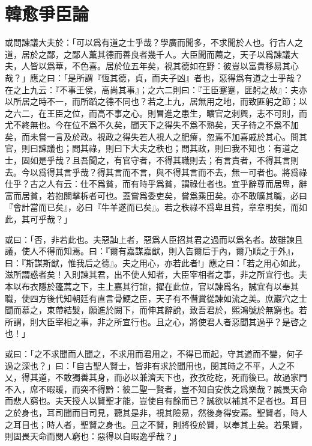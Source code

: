 \section[爭臣論\quad{\small 韓愈}]{{\normalsize 韓愈}\quad 爭臣論}
或問諫議大夫於：「可以爲有道之士乎哉？學廣而聞多，不求聞於人也。行古人之道，居於之鄙，之鄙人薰其德而善良者幾千人。大臣聞而薦之，天子以爲諫議大夫，人皆以爲華，不色喜。居於位五年矣，視其德如在野：彼豈以富貴移易其心哉？」應之曰：「是所謂『恆其德，貞，而夫子凶』者也，惡得爲有道之士乎哉？在之上九云：『不事王侯，高尚其事』；之六二則曰：『王臣蹇蹇，匪躬之故』：夫亦以所居之時不一，而所蹈之德不同也？若之上九，居無用之地，而致匪躬之節；以之六二，在王臣之位，而高不事之心。則冒進之患生，曠官之刺興，志不可則，而尤不終無也。今在位不爲不久矣，聞天下之得失不爲不熟矣，天子待之不爲不加矣，而未嘗一言及於政。視政之得失若人視人之肥瘠，忽焉不加喜戚於其心。問其官，則曰諫議也；問其祿，則曰下大夫之秩也；問其政，則曰我不知也：有道之士，固如是乎哉？且吾聞之，有官守者，不得其職則去；有言責者，不得其言則去。今以爲得其言乎哉？得其言而不言，與不得其言而不去，無一可者也。將爲祿仕乎？古之人有云：仕不爲貧，而有時乎爲貧，謂祿仕者也。宜乎辭尊而居卑，辭富而居貧，若抱關擊柝者可也。蓋嘗爲委吏矣，嘗爲乘田矣。亦不敢曠其職，必曰『會計當而已矣』，必曰『牛羊遂而已矣』。若之秩祿不爲卑且貧，章章明矣，而如此，其可乎哉？」

或曰：「否，非若此也。夫惡訕上者，惡爲人臣招其君之過而以爲名者。故雖諫且議，使人不得而知焉。曰：『爾有嘉謀嘉猷，則入告爾后于內，爾乃順之于外』，曰：『斯謀斯猷，惟我后之德』。夫之用心，亦若此者!」應之曰：「若之用心如此，滋所謂惑者矣！入則諫其君，出不使人知者，大臣宰相者之事，非之所宜行也。夫本以布衣隱於蓬蒿之下，主上嘉其行誼，擢在此位，官以諫爲名，誠宜有以奉其職，使四方後代知朝廷有直言骨鯁之臣，天子有不僭賞從諫如流之美。庶巖穴之士聞而慕之，束帶結髮，願進於闕下，而伸其辭說，致吾君於，熙鴻號於無窮也。若所謂，則大臣宰相之事，非之所宜行也。且之心，將使君人者惡聞其過乎？是啓之也！」

或曰：「之不求聞而人聞之，不求用而君用之，不得已而起，守其道而不變，何子過之深也？」曰：「自古聖人賢士，皆非有求於聞用也，閔其時之不平，人之不乂，得其道，不敢獨善其身，而必以兼濟天下也，孜孜矻矻，死而後已。故過家門不入，席不暇暖，而突不得黔：彼二聖一賢者，豈不知自安佚之爲樂哉？誠畏天命而悲人窮也。夫天授人以賢聖才能，豈使自有餘而已？誠欲以補其不足者也。耳目之於身也，耳司聞而目司見，聽其是非，視其險易，然後身得安焉。聖賢者，時人之耳目也；時人者，聖賢之身也。且之不賢，則將役於賢，以奉其上矣。若果賢，則固畏天命而閔人窮也：惡得以自暇逸乎哉？」

